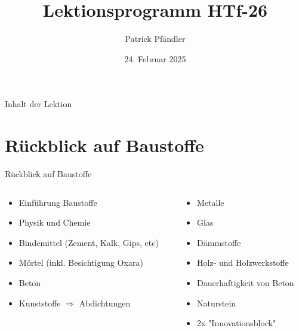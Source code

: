 \def\customoptions{aspectratio=169} %



\title{\textbf{Lektionsprogramm HTf-26}}
\author{Patrick Pfändler}
\date{24. Februar 2025}




\frame{\titlepage}

\begin{frame}{Inhalt der Lektion}
    \tableofcontents
\end{frame}

\folieFragen

\section{Rückblick auf Baustoffe}
\begin{frame}{Rückblick auf Baustoffe}
    \begin{columns}
        \begin{column}{0.5\textwidth}
            \begin{itemize}
                \item[\textbullet] Einführung Baustoffe 
                \item[\textbullet] Physik und Chemie 
                \item[\textbullet] Bindemittel (Zement, Kalk, Gips, etc) 
                \item[\textbullet] Mörtel (inkl. Besichtigung Oxara)
                \item[\textbullet] Beton
                \item[\textbullet] Kunststoffe $\Rightarrow$ Abdichtungen 
            \end{itemize}
        \end{column}

        \begin{column}{0.5\textwidth}
            \begin{itemize}
                \item[\textbullet] Metalle 
                \item[\textbullet] Glas 
                \item[\textbullet] Dämmstoffe 
                \item[\textbullet] Holz- und Holzwerkstoffe 
                \item[\textbullet] Dauerhaftigkeit von Beton
                \item[\textbullet] Naturstein
                \item[\textbullet] 2x "Innovationsblock"
            \end{itemize}
        \end{column}
    \end{columns}
\end{frame}

